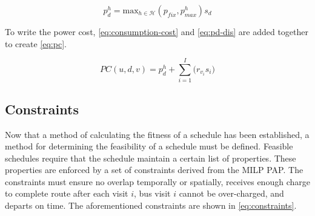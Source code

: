 \documentclass[11pt,a4paper,final]{article}
\newcommand{\PC}{PC(u, d, v)}               %
\newcommand{\Hset}{\mathcal{H}}             %
\begin{document}
\begin{equation}
\label{eq:pd-dis}
  p_d^h = \text{max}_{h \in \Hset}(p_{fix}, p_{max}^h)s_d
\end{equation}

To write the power cost, \ref{eq:consumption-cost} and \ref{eq:pd-dis} are added together to create \ref{eq:pc}.

\begin{equation}
\label{eq:pc}
\PC = p^h_d + \sum_{i=1}^I \Big( r_{v_i}s_i \Big)
\end{equation}

\subsection{Constraints}
\label{sec:constraints}
Now that a method of calculating the fitness of a schedule has been established, a method for determining the
feasibility of a schedule must be defined. Feasible schedules require that the schedule maintain a certain list of
properties. These properties are enforced by a set of constraints derived from the MILP PAP. The constraints must ensure
no overlap temporally or spatially, receives enough charge to complete route after each visit \(i\), bus visit \(i\) cannot
be over-charged, and departs on time. The aforementioned constraints are shown in \ref{eq:constraints}.
\end{document}
